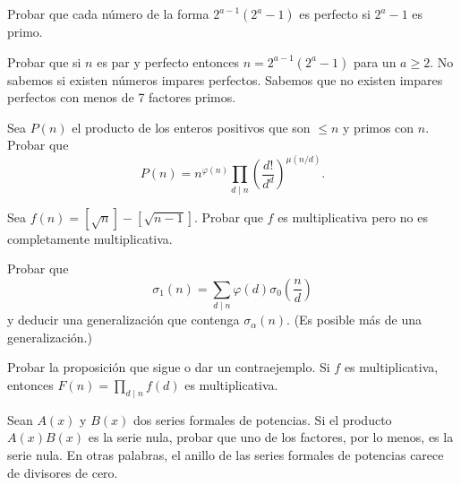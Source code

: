 \documentclass[12pt,a4paper]{book}
\begin{document}
    \begin{ejercicio}
        Probar que cada número de la forma $2^{a-1}(2^a-1)$ es perfecto si $2^a-1$ es
        primo.
    \end{ejercicio}

    \begin{ejercicio}
        Probar que si $n$ es par y perfecto entonces $n=2^{a-1}(2^a-1)$ para un $a\geq2$.
        No sabemos si existen números impares perfectos. Sabemos que no existen impares
        perfectos con menos de 7 factores primos.
    \end{ejercicio}

    \begin{ejercicio}
        Sea $P(n)$ el producto de los enteros positivos que son $\leq n$ y primos con $n$.
        Probar que
        \begin{equation*}
            P(n)=n^{\varphi(n)}\prod_{d\mid n}\left(\frac{d!}{d^d}\right)^{\mu(n/d)}.
        \end{equation*}
    \end{ejercicio}

    \begin{ejercicio}
        Sea $f(n)=[\sqrt n]-[\sqrt{n-1}]$. Probar que $f$ es multiplicativa pero no es
        completamente multiplicativa.
    \end{ejercicio}

    \begin{ejercicio}
        Probar que
        \begin{equation*}
            \sigma_1(n)=\sum_{d\mid n}\varphi(d)\sigma_0\left(\frac{n}{d}\right)
        \end{equation*}
        y deducir una generalización que contenga $\sigma_\alpha(n)$. (Es posible más de
        una generalización.)
    \end{ejercicio}

    \begin{ejercicio}
        Probar la proposición que sigue o dar un contraejemplo. Si $f$ es multiplicativa,
        entonces $F(n)=\prod_{d\mid n}f(d)$ es multiplicativa.
    \end{ejercicio}

    \begin{ejercicio}
        Sean $A(x)$ y $B(x)$ dos series formales de potencias. Si el producto $A(x)B(x)$
        es la serie nula, probar que uno de los factores, por lo menos, es la serie nula.
        En otras palabras, el anillo de las series formales de potencias carece de
        divisores de cero.
    \end{ejercicio}
\end{document}
